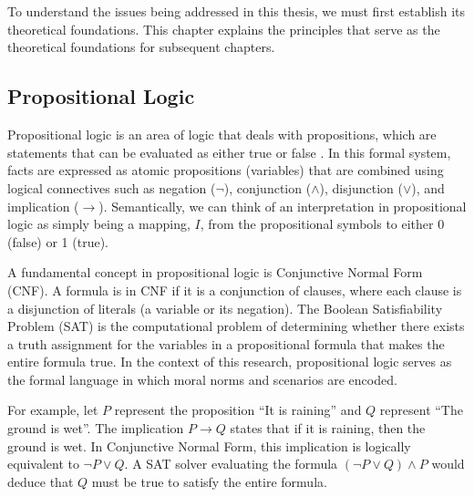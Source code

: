 \chapter{\babDua}
\label{bab:2}

To understand the issues being addressed in this thesis, we must first establish its theoretical foundations. This chapter explains the principles that serve as the theoretical foundations for subsequent chapters.


\section{Propositional Logic}
\label{sec:propositionalLogic}
Propositional logic is an area of logic that deals with propositions, which are statements that can be evaluated as either true or false \citep{rosen2012discrete}. In this formal system, facts are expressed as atomic propositions (variables) that are combined using logical connectives such as negation ($\neg$), conjunction ($\land$), disjunction ($\lor$), and implication ($\rightarrow$). Semantically, we can think of an interpretation in propositional logic as simply being a mapping, $I$, from the propositional symbols to either 0 (false) or 1 (true).

A fundamental concept in propositional logic is Conjunctive Normal Form (CNF). A formula is in CNF if it is a conjunction of clauses, where each clause is a disjunction of literals (a variable or its negation). The Boolean Satisfiability Problem (SAT) is the computational problem of determining whether there exists a truth assignment for the variables in a propositional formula that makes the entire formula true. In the context of this research, propositional logic serves as the formal language in which moral norms and scenarios are encoded.

For example, let $P$ represent the proposition ``It is raining'' and $Q$ represent ``The ground is wet''. The implication $P \rightarrow Q$ states that if it is raining, then the ground is wet. In Conjunctive Normal Form, this implication is logically equivalent to $\neg P \lor Q$. A SAT solver evaluating the formula $(\neg P \lor Q) \land P$ would deduce that $Q$ must be true to satisfy the entire formula.

